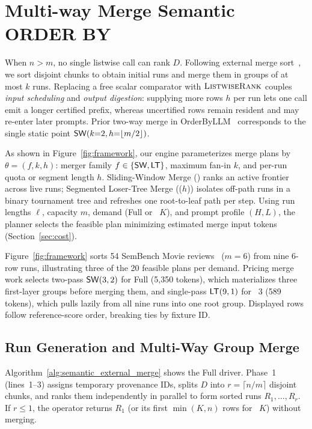 \section{Multi-way Merge Semantic \textsf{ORDER BY}}
\label{sec:framework}

When $n > m$, no single listwise call can rank $D$. Following external merge sort~\cite{DBLP:journals/csur/Graefe06}, we sort disjoint chunks to obtain initial runs and merge them in groups of at most $k$ runs. Replacing a free scalar comparator with $\textsc{ListwiseRank}$ couples \emph{input scheduling} and \emph{output digestion}: supplying more rows $h$ per run lets one call emit a longer certified prefix, whereas uncertified rows remain resident and may re-enter later prompts. Prior two-way merge in OrderByLLM~\cite{DBLP:journals/corr/abs-2509-00303} corresponds to the single static point ${\mathsf{SW}}{}(k{=}2, h{=}\lfloor m/2\rfloor)$.

As shown in Figure~\ref{fig:framework}, our engine parameterizes merge plans by $\theta = (f, k, h)$: merger family $f \in \{{\mathsf{SW}}{}, {\mathsf{LT}}{}\}$, maximum fan-in $k$, and per-run quota or segment length $h$. Sliding-Window Merge (\SW) ranks an active frontier across live runs; Segmented Loser-Tree Merge (\LT($h$)) isolates off-path runs in a binary tournament tree and refreshes one root-to-leaf path per step. Using run lengths $\boldsymbol{\ell}$, capacity $m$, demand (Full or \LIMIT~$K$), and prompt profile $(H,L)$, the planner selects the feasible plan minimizing estimated merge input tokens (Section~\ref{sec:cost}).

\begin{example}\label{ex:framework}
Figure~\ref{fig:framework} sorts 54 SemBench Movie \Qnine{} reviews~\cite{lao2026sembench} ($m{=}6$) from nine 6-row runs, illustrating three of the 20 feasible plans per demand. Pricing merge work selects two-pass ${\mathsf{SW}}{}(3,2)$ for Full (5,350 tokens), which materializes three first-layer groups before merging them, and single-pass ${\mathsf{LT}}{}(9,1)$ for \LIMIT~3 (589 tokens), which pulls lazily from all nine runs into one root group. Displayed rows follow reference-score order, breaking ties by fixture ID.
\end{example}

\subsection{Run Generation and Multi-Way Group Merge}
\label{sec:external-merge}
Algorithm~\ref{alg:semantic_external_merge} shows the Full driver. Phase~1 (lines~1--3) assigns temporary provenance IDs, splits $D$ into $r = \lceil n/m \rceil$ disjoint chunks, and ranks them independently in parallel to form sorted runs $R_1,\dots,R_r$. If $r \le 1$, the operator returns $R_1$ (or its first $\min(K,n)$ rows for \LIMIT~$K$) without merging.

